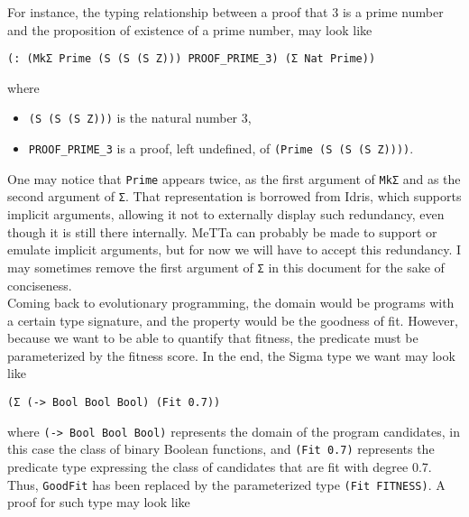 \documentclass[]{report}
\begin{document}
For instance, the typing relationship between a proof that 3 is a
prime number and the proposition of existence of a prime number, may
look like
\begin{verbatim}
(: (MkΣ Prime (S (S (S Z))) PROOF_PRIME_3) (Σ Nat Prime))
\end{verbatim}
where
\begin{itemize}
\item \texttt{(S (S (S Z)))} is the natural number 3,
\item \texttt{PROOF_PRIME_3} is a proof, left
  undefined, of \texttt{(Prime (S (S (S Z))))}.
\end{itemize}
One may notice that \texttt{Prime} appears twice, as the
first argument of \texttt{MkΣ} and as the second argument
of \texttt{Σ}.  That representation is borrowed from
Idris, which supports implicit arguments, allowing it not to
externally display such redundancy, even though it is still there
internally.  MeTTa can probably be made to support or emulate implicit
arguments, but for now we will have to accept this redundancy.  I may
sometimes remove the first argument of \texttt{Σ} in this
document for the sake of conciseness.\\

Coming back to evolutionary programming, the domain would be programs
with a certain type signature, and the property would be the goodness
of fit.  However, because we want to be able to quantify that fitness,
the predicate must be parameterized by the fitness score.  In the end,
the Sigma type we want may look like
\begin{verbatim}
(Σ (-> Bool Bool Bool) (Fit 0.7))
\end{verbatim}
where \texttt{(-> Bool Bool Bool)} represents the domain
of the program candidates, in this case the class of binary Boolean
functions, and \texttt{(Fit 0.7)} represents the predicate
type expressing the class of candidates that are fit with degree 0.7.
Thus, \texttt{GoodFit} has been replaced by the
parameterized type \texttt{(Fit FITNESS)}.  A proof for
such type may look like
\end{document}

